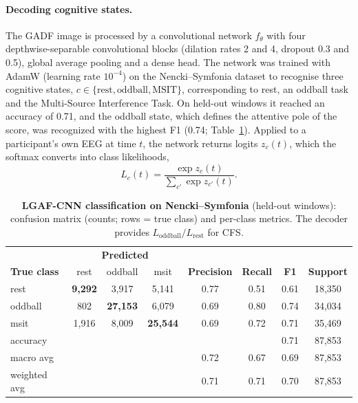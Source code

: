 \documentclass[utf8]{frontiers_suppmat}
\begin{document}
\paragraph*{Decoding cognitive states.} The GADF image is processed by a convolutional network $f_\theta$ with four depthwise-separable convolutional blocks (dilation rates 2 and 4, dropout 0.3 and 0.5), global average pooling and a dense head. The network was trained with AdamW (learning rate $10^{-4}$) on the Nencki--Symfonia dataset \cite{ds004621:1.0.3} to recognise three cognitive states, $c\in\{\text{rest},\text{oddball},\text{MSIT}\}$, corresponding to rest, an oddball task and the Multi-Source Interference Task. On held-out windows it reached an accuracy of 0.71, and the oddball state, which defines the attentive pole of the score, was recognized with the highest F1 (0.74; Table~\ref{tab:lgaf_class}). Applied to a participant's own EEG at time $t$, the network returns logits $z_c(t)$, which the softmax converts into class likelihoods,
\begin{equation}\label{eq:softmax}
L_c(t)=\frac{\exp z_c(t)}{\sum_{c'}\exp z_{c'}(t)} .
\end{equation}

\begin{table}[!htb]
\centering
\caption{\textbf{LGAF-CNN classification on Nencki--Symfonia} (held-out windows): confusion matrix (counts; rows = true class) and per-class metrics. The decoder provides $L_{\mathrm{oddball}}/L_{\mathrm{rest}}$ for CFS.}
\vspace{0.5em}
\begin{tabular}{lccc|cccc}
\toprule
& \multicolumn{3}{c|}{\textbf{Predicted}} & & & & \\
\textbf{True class} & rest & oddball & msit & \textbf{Precision} & \textbf{Recall} & \textbf{F1} & \textbf{Support} \\
\midrule
rest    & \textbf{9,292} & 3,917 & 5,141 & 0.77 & 0.51 & 0.61 & 18,350 \\
oddball & 802 & \textbf{27,153} & 6,079 & 0.69 & 0.80 & 0.74 & 34,034 \\
msit    & 1,916 & 8,009 & \textbf{25,544} & 0.69 & 0.72 & 0.71 & 35,469 \\
\midrule
accuracy & & & & & & 0.71 & 87,853 \\
macro avg & & & & 0.72 & 0.67 & 0.69 & 87,853 \\
weighted avg & & & & 0.71 & 0.71 & 0.70 & 87,853 \\
\bottomrule
\end{tabular}
\label{tab:lgaf_class}
\end{table}
\end{document}
